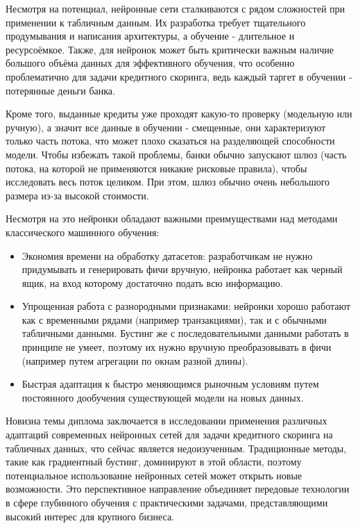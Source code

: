 \documentclass[12pt]{article}
\begin{document}
Несмотря на потенциал, нейронные сети сталкиваются с рядом сложностей при применении к табличным данным. Их разработка требует тщательного продумывания и написания архитектуры, а обучение - длительное и ресурсоёмкое. Также, для нейронок может быть критически важным наличие большого объёма данных для эффективного обучения, что особенно проблематично для задачи кредитного скоринга, ведь каждый таргет в обучении - потерянные деньги банка. 

Кроме того, выданные кредиты уже проходят какую-то проверку (модельную или ручную), а значит все данные в обучении - смещенные, они характеризуют только часть потока, что может плохо сказаться на разделяющей способности модели. Чтобы избежать такой проблемы, банки обычно запускают шлюз (часть потока, на которой не применяются никакие рисковые правила), чтобы исследовать весь поток целиком. При этом, шлюз обычно очень небольшого размера из-за высокой стоимости.

 Несмотря на это нейронки обладают важными преимуществами над методами классического машинного обучения:
\begin{itemize}
    \item Экономия времени на обработку датасетов: разработчикам не нужно придумывать и генерировать фичи вручную, нейронка работает как черный ящик, на вход которому достаточно подать всю информацию.
    
    \item Упрощенная работа с разнородными признаками: нейронки хорошо работают как с временными рядами (например транзакциями), так и с обычными табличными данными. Бустинг же с последовательными данными работать в принципе не умеет, поэтому их нужно вручную преобразовывать в фичи (например путем агрегации по окнам разной длины).
    
    \item Быстрая адаптация к быстро меняющимся рыночным условиям путем постоянного дообучения существующей модели на новых данных.
\end{itemize}

Новизна темы диплома заключается в исследовании применения различных адаптаций современных нейронных сетей для задачи кредитного скоринга на табличных данных, что сейчас является недоизученным. Традиционные методы, такие как градиентный бустинг, доминируют в этой области, поэтому потенциальное использование нейронных сетей может открыть новые возможности. Это перспективное направление объединяет передовые технологии в сфере глубинного обучения с практическими задачами, представляющими высокий интерес для крупного бизнеса.
\end{document}

